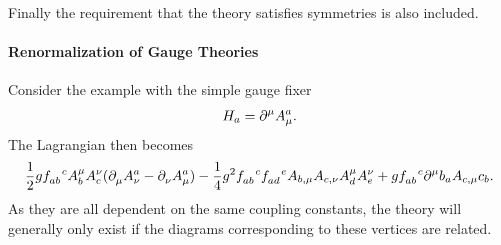 Finally the requirement that the theory satisfies symmetries is also included.

\paragraph{Renormalization of Gauge Theories}
Consider the example with the simple gauge fixer
\begin{align*}
	H_{a} = \partial^{\mu}_{}A_{\mu}^{a}.
\end{align*}
The Lagrangian then becomes
\begin{align*}
	\frac{1}{2}g\srconst{ab}{c}A^{\mu}_{b}A^{\nu}_{c}(\del{}{\mu}A_{\nu}^{a} - \del{}{\nu}A_{\mu}^{a}) - \frac{1}{4}g^{2}\srconst{ab}{c}\srconst{ad}{e}A_{b, \mu}A_{c, \nu}A^{\mu}_{d}A^{\nu}_{e} + g\srconst{ab}{c}\del{\mu}{}b_{a}A_{c, \mu}c_{b}.
\end{align*}
As they are all dependent on the same coupling constants, the theory will generally only exist if the diagrams corresponding to these vertices are related.

